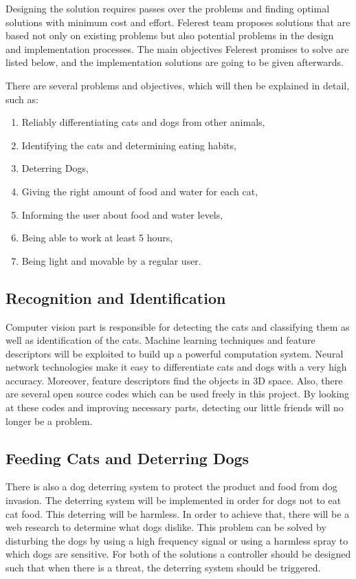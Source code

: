 Designing the solution requires passes over the problems and finding optimal solutions with minimum cost and effort. Felerest team proposes solutions that are based not only on existing problems but also potential problems in the design and implementation processes. The main objectives Felerest promises to solve are listed below, and the implementation solutions are going to be given afterwards.

There are several problems and objectives, which will then be explained in detail, such as:

\begin{enumerate}
    \item Reliably differentiating cats and dogs from other animals,
    \item Identifying the cats and determining eating habits,
    \item Deterring Dogs,
    \item Giving the right amount of food and water for each cat,
    \item Informing the user about food and water levels,
    \item Being able to work at least 5 hours,
    \item Being light and movable by a regular user.
\end{enumerate}

\subsection{Recognition and Identification}
Computer vision part is responsible for detecting the cats and classifying them as well as identification of the cats. Machine learning techniques and feature descriptors will be exploited to build up a powerful computation system. Neural network technologies make it easy to differentiate cats and dogs with a very high accuracy. Moreover, feature descriptors find the objects in 3D space. Also, there are several open source codes which can be used freely in this project. By looking at these codes and improving necessary parts, detecting our little friends will no longer be a problem.

\subsection{Feeding Cats and Deterring Dogs}

There is also a dog deterring system to protect the product and food from dog invasion. The deterring system will be implemented in order for dogs not to eat cat food. This deterring will be harmless. In order to achieve that, there will be a web research to determine what dogs dislike. This problem can be solved by disturbing the dogs by using a high frequency signal \cite{cite:Dogrepellingdetterent} or using a harmless spray \cite{cite:Dogrepellingsprey} to which dogs are sensitive. For both of the solutions a controller should be designed such that when there is a threat, the deterring system should be triggered.

